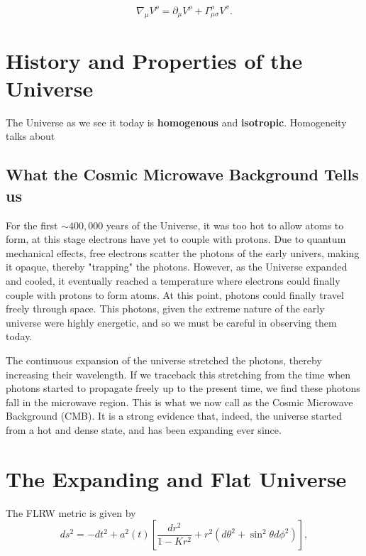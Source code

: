 \documentclass[a4paper,11pt]{article}
\begin{document}
\begin{equation}
    \nabla_\mu V^\rho = \partial_\mu V^\rho + \Gamma^\rho_{\mu\sigma} V^\sigma.
    \label{covariant-derivative-christofell}
\end{equation}



\section{History and Properties of the Universe}
The Universe as we see it today is \textbf{homogenous} and \textbf{isotropic}. Homogeneity talks about

\subsection{What the Cosmic Microwave Background Tells us}
For the first $\sim400,000$ years of the Universe, it was too hot to allow atoms to form, at
this stage electrons have yet to couple with protons. Due to quantum mechanical effects, free electrons scatter
the photons of the early univers, making it opaque, thereby "trapping" the photons. 
However, as the Universe expanded and cooled, it eventually reached a temperature
where electrons could finally couple with protons to form atoms. At this point,
photons could finally travel freely through space. This photons, given the extreme nature of the early universe
were highly energetic, and so we must be careful in observing them today.

The continuous expansion of the universe
stretched the photons, thereby increasing their wavelength. If we traceback this stretching from the time when 
photons started to propagate freely up to the present time, we find these photons fall in the microwave region. 
This is what we now call as the Cosmic Microwave Background (CMB). It is a strong evidence that, indeed, 
the universe started from a hot and dense state, and has been expanding ever since. 







\section{The Expanding and Flat Universe}
The FLRW metric is given by 
\begin{equation}
    ds^2 = -dt^2 + a^2(t) \left[ \frac{dr^2}{1-Kr^2} + r^2 (d\theta^2 + \sin^2 \theta d\phi^2) \right],
    \label{flrw-metric}
\end{equation}
\end{document}
